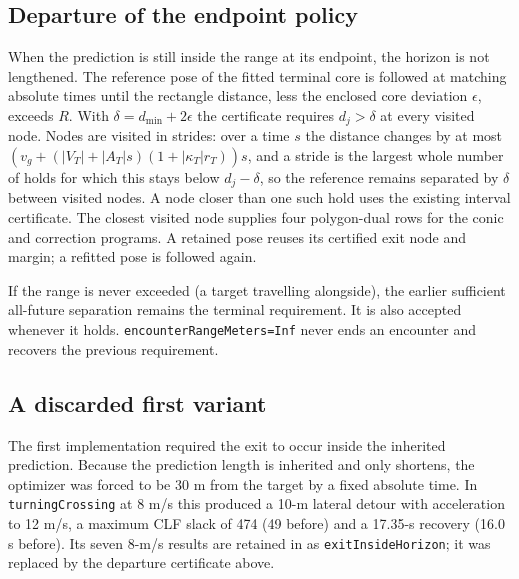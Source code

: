 \documentclass[11pt]{article}
\begin{document}
\subsection{Departure of the endpoint policy}
When the prediction is still inside the range at its endpoint, the horizon is
not lengthened. The reference pose of the fitted terminal core is followed at
matching absolute times until the rectangle distance, less the enclosed core
deviation $\epsilon$, exceeds $R$. With $\delta=d_{\min}+2\epsilon$ the
certificate requires $d_j>\delta$ at every visited node. Nodes are visited in
strides: over a time $s$ the distance changes by at most
$(v_g+(|V_T|+|A_T|s)(1+|\kappa_T|r_T))s$, and a stride is the largest whole
number of holds for which this stays below $d_j-\delta$, so the reference
remains separated by $\delta$ between visited nodes. A node closer than one
such hold uses the existing interval certificate. The closest visited node
supplies four polygon-dual rows for the conic and correction programs. A
retained pose reuses its certified exit node and margin; a refitted pose is
followed again.

If the range is never exceeded (a target travelling alongside), the earlier
sufficient all-future separation remains the terminal requirement. It is
also accepted whenever it holds. \texttt{encounterRangeMeters=Inf} never ends
an encounter and recovers the previous requirement.

\subsection{A discarded first variant}
The first implementation required the exit to occur inside the inherited
prediction. Because the prediction length is inherited and only shortens, the
optimizer was forced to be 30 m from the target by a fixed absolute time. In
\texttt{turningCrossing} at 8 m/s this produced a 10-m lateral detour with
acceleration to 12 m/s, a maximum CLF slack of 474 (49 before) and a
17.35-s recovery (16.0 s before). Its seven 8-m/s results are retained in
 as \texttt{exitInsideHorizon}; it was replaced by the
departure certificate above.
\end{document}
